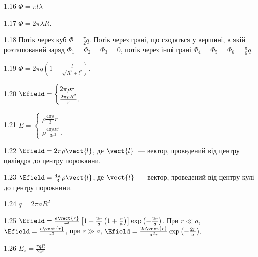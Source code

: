 \begin{Solution}{1.{16}}
	$\Phi = \pi l \lambda$
\end{Solution}
\begin{Solution}{1.{17}}
	$\Phi = 2\pi\lambda R$.
\end{Solution}
\begin{Solution}{1.{18}}
	Потік через куб $\Phi = \frac{\pi}{2}q$. Потік через грані, що сходяться у вершині, в якій розташований заряд $\Phi_1 = \Phi_2 =\Phi_3 = 0$, потік через інші грані $\Phi_4 = \Phi_5 =\Phi_6 = \frac{\pi}{6}q$.
\end{Solution}
\begin{Solution}{1.{19}}
	$\Phi = 2\pi q\left( 1 - \frac{l}{\sqrt{R^2 + l^2}}\right) $.
\end{Solution}
\begin{Solution}{1.{20}}
	$\Efield =
		\begin{cases}
			2\pi\rho r\\
			\frac{2\pi\rho R^2}{r}.
		\end{cases}
	$
\end{Solution}
\begin{Solution}{1.{21}}
	$E =
		\begin{cases}
			\rho\frac{4\pi\rho}{3}r\\
			\rho\frac{4\pi\rho R^3}{3 r^2}.
		\end{cases}
	$
\end{Solution}
\begin{Solution}{1.{22}}
	$\Efield = 2\pi\rho \vect{l}$, де $\vect{l}$~--- вектор, проведений від центру циліндра до центру порожнини.
\end{Solution}
\begin{Solution}{1.{23}}
	$\Efield = \frac{4\pi}{3}\rho \vect{l}$, де $\vect{l}$~--- вектор, проведений від центру кулі до центру порожнини.
\end{Solution}
\begin{Solution}{1.{24}}
	$q = 2\pi a R^2$
\end{Solution}
\begin{Solution}{1.{25}}
	$\Efield = \frac{e\vect{r}}{r^3} \left[ 1 + \frac{2r}{a} \left( 1 + \frac{r}{a} \right) \right]\exp{\left( -\frac{2r}{a}\right) }$. При $r\ll a$, $\Efield = \frac{e\vect{r}}{r^3}$, при $r \gg a$, $\Efield = \frac{2e\vect{r}}{a^2r}\exp{\left( -\frac{2r}{a}\right) }.$
\end{Solution}
\begin{Solution}{1.{26}}
	$E_z = \frac{\pi qR}{2z^3}$
\end{Solution}

